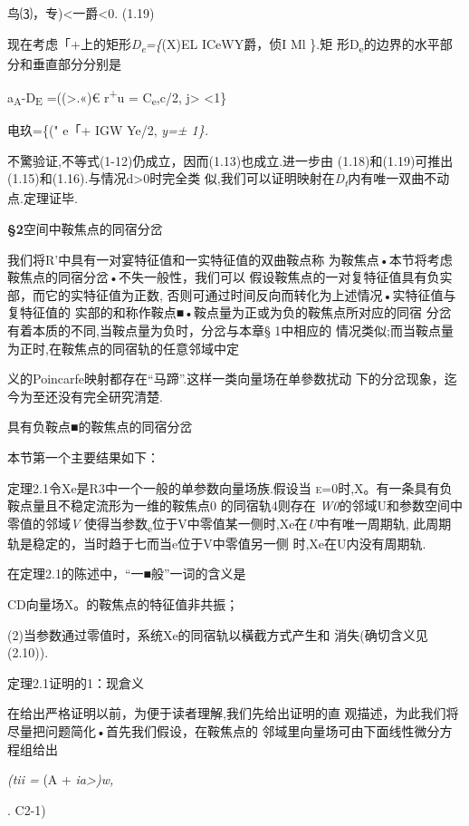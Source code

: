 \documentclass{article}
\begin{document}
鸟⑶，专)\textless{}一爵\textless{}0. (1.19)

现在考虑「+上的矩形\emph{D\textsubscript{e}=\{}(X)EL ICeWY爵，侦I Ml
\}.矩 形D\textsubscript{e}的边界的水平部分和垂直部分分别是

a\textsubscript{A}-D\textsubscript{E} =((\textgreater{}.«)€
r\textsuperscript{+}u = C\textsubscript{e},c/2,
\textbar{}j\textgreater{}\textbar{} \textless{}1\}

电玖=\{(" e「+ IGW Ye/2, \emph{y=± 1\}.}

不驚验证,不等式(1-12)仍成立，因而(1.13)也成立.进一步由
(1.18)和(1.19)可推出(1.15)和(1.16).与情况d\textgreater{}0时完全类
似,我们可以证明映射在\emph{D\textsubscript{t}}内有唯一双曲不动点.定理证毕.\textbar{}

\protect\hypertarget{bookmark268}{}{}\textbf{§2}空间中鞍焦点的同宿分岔

我们将R'中具有一对宴特征值和一实特征值的双曲鞍点称
为鞍焦点•本节将考虑鞍焦点的同宿分岔•不失一般性，我们可以
假设鞍焦点的一对复特征值具有负实部，而它的实特征值为正数,
否则可通过时间反向而转化为上述情况•实特征值与复特征值的
实部的和称作鞍点■•鞍点量为正或为负的鞍焦点所对应的同宿
分岔有着本质的不同,当鞍点量为负时，分岔与本章§ 1中相应的
情况类似;而当鞍点量为正时,在鞍焦点的同宿轨的任意邻域中定

义的Poincarfe映射都存在``马蹄''.这样一类向量场在单參数扰动
下的分岔现象，迄今为至还没有完全研究清楚.

具有负鞍点■的鞍焦点的同宿分岔

本节第一个主要结果如下：

定理2.1令Xe是R3中一个一般的单参数向量场族.假设当
\textsc{e=0}时,X。有一条具有负鞍点量且不稳定流形为一维的鞍焦点0
的同宿轨4则存在 \emph{W0}的邻域U和参数空间中零值的邻域\emph{V}
使得当参数\textsubscript{e}位于V中零值某一侧时,Xe在\emph{U}中有唯一周期轨,
此周期轨是稳定的，当时趋于七而当e位于V中零值另一侧 时,Xe在U内没有周期轨.

在定理2.1的陈述中，``一■般''一词的含义是

CD向量场X。的鞍焦点的特征值非共振；

(2)当参数通过零值时，系统Xe的同宿轨以橫截方式产生和
消失(确切含义见(2.10)).

定理2.1证明的1：现倉义

在给出严格证明以前，为便于读者理解,我们先给出证明的直
观描述，为此我们将尽量把问题简化•首先我们假设，在鞍焦点的
邻域里向量场可由下面线性微分方程组给出

\emph{(tii =} (A + \emph{ia\textgreater{})w,}

. C2-1)
\end{document}
